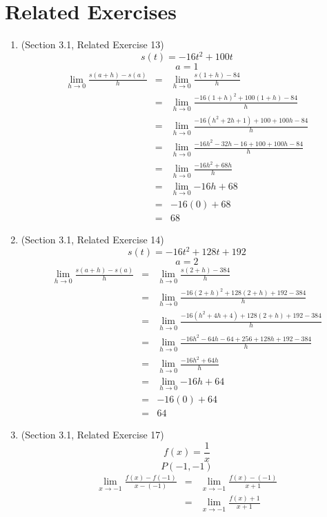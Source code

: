 \documentclass{article}
\begin{document}
\section*{Related Exercises}
\begin{enumerate}
    \item (Section 3.1, Related Exercise 13)
    $$s(t) = -16t^2 + 100t$$
    $$a = 1$$
    \begin{eqnarray}
        \lim_{h \to 0}{\frac{s(a + h) - s(a)}{h}} &=& \lim_{h \to 0}{\frac{s(1 + h) - 84}{h}} \\
        &=& \lim_{h \to 0}{\frac{-16(1 + h)^2 + 100(1 + h) - 84}{h}} \\
        &=& \lim_{h \to 0}{\frac{-16(h^2 + 2h + 1) + 100 + 100h - 84}{h}} \\
        &=& \lim_{h \to 0}{\frac{-16h^2 - 32h - 16 + 100 + 100h - 84}{h}} \\
        &=& \lim_{h \to 0}{\frac{-16h^2 + 68h}{h}} \\
        &=& \lim_{h \to 0}{-16h + 68} \\
        &=& -16(0) + 68 \\
        &=& 68
    \end{eqnarray}
    \item (Section 3.1, Related Exercise 14)
    $$s(t) = -16t^2 + 128t + 192$$
    $$a = 2$$
    \begin{eqnarray}
        \lim_{h \to 0}{\frac{s(a + h) - s(a)}{h}} &=& \lim_{h \to 0}{\frac{s(2 + h) - 384}{h}} \\
        &=& \lim_{h \to 0}{\frac{-16(2 + h)^2 + 128(2 + h) + 192 - 384}{h}} \\
        &=& \lim_{h \to 0}{\frac{-16(h^2 + 4h + 4) + 128(2 + h) + 192 - 384}{h}} \\
        &=& \lim_{h \to 0}{\frac{-16h^2 - 64h - 64 + 256 + 128h + 192 - 384}{h}} \\
        &=& \lim_{h \to 0}{\frac{-16h^2 + 64h}{h}} \\
        &=& \lim_{h \to 0}{-16h + 64} \\
        &=& -16(0) + 64 \\
        &=& 64
    \end{eqnarray}
    \item (Section 3.1, Related Exercise 17)
    $$f(x) = \frac{1}{x}$$
    $$P(-1, -1)$$
    \begin{eqnarray}
        \lim_{x \to -1}{\frac{f(x) - f(-1)}{x - (-1)}} &=& \lim_{x \to -1}{\frac{f(x) - (-1)}{x + 1}} \\
        &=& \lim_{x \to -1}{\frac{f(x) + 1}{x + 1}} \\

\end{eqnarray}
\end{enumerate}
\end{document}
